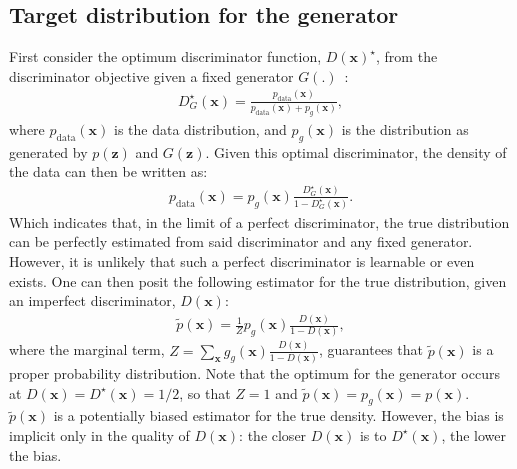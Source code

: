 \documentclass[10pt]{article}
\newcommand{\vect}[1]{\mathbf{#1}}
\newcommand{\vx}[0]{\vect{x}}
\newcommand{\vz}[0]{\vect{z}}
\begin{document}
\subsection{Target distribution for the generator}
First consider the optimum discriminator function, $D(\vx)^{\star}$, from the discriminator objective given a fixed generator $G(.)$~\citep{goodfellow2014generative}:
\begin{align}
D^{\star}_G(\vx) = \frac{p_{\text{data}}(\vx)}{p_{\text{data}}(\vx) + p_g(\vx)},
\end{align}
where $p_{\text{data}}(\vx)$ is the data distribution, and $p_g(\vx)$ is the distribution as generated by $p(\vz)$ and $G(\vz)$.
Given this optimal discriminator, the density of the data can then be written as:
\begin{align}
p_{\text{data}}(\vx) = p_g(\vx) \frac{D^{\star}_G(\vx)}{1 - D^{\star}_G(\vx)}.
\end{align}
Which indicates that, in the limit of a perfect discriminator, the true distribution can be perfectly estimated from said discriminator and any fixed generator.
However, it is unlikely that such a perfect discriminator is learnable or even exists.
One can then posit the following estimator for the true distribution, given an imperfect discriminator, $D(\vx)$:
\begin{align}
\tilde{p}(\vx) = \frac{1}{Z} p_g(\vx) \frac{D(\vx)}{1 - D(\vx)},
\label{eq:target}
\end{align}
where the marginal term, $Z = \sum_{\vx} g_g(\vx) \frac{D(\vx)}{1 - D(\vx)}$, guarantees that $\tilde{p}(\vx)$ is a proper probability distribution.
Note that the optimum for the generator occurs at $D(\vx) = D^{\star}(\vx) = 1/2$, so that $Z = 1$ and $\tilde{p}(\vx) = p_g(\vx) = p(\vx)$.
$\tilde{p}(\vx)$ is a potentially biased estimator for the true density.
However, the bias is implicit only in the quality of $D(\vx)$: the closer $D(\vx)$ is to $D^{\star}(\vx)$, the lower the bias.
\end{document}
